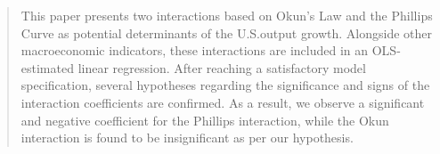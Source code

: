 \begin{abstract}
This paper presents two interactions based on Okun's Law and the Phillips Curve as potential determinants of the U.S.\@ output growth.
Alongside other macroeconomic indicators, these interactions are included in an OLS-estimated linear regression.
After reaching a satisfactory model specification, several hypotheses regarding the significance and signs of the interaction coefficients are confirmed.
As a result, we observe a significant and negative coefficient for the Phillips interaction, while the Okun interaction is found to be insignificant as per our hypothesis.
\end{abstract}
